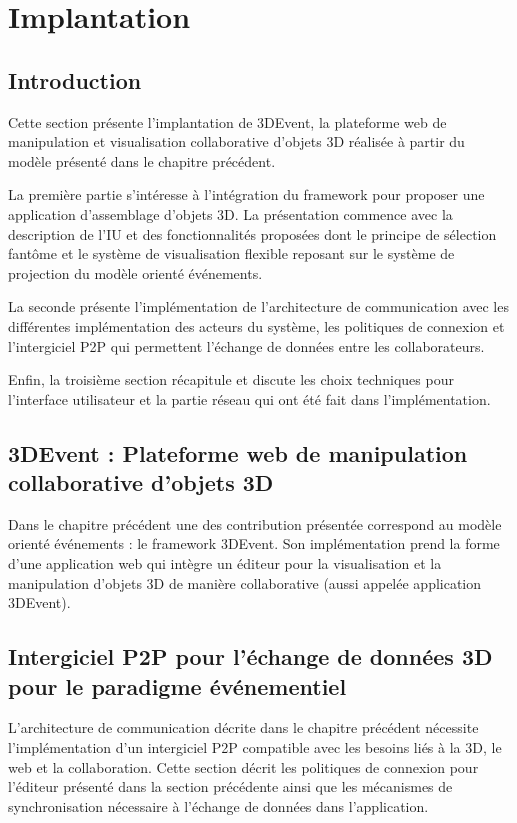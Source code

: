 
\chapter{Implantation}
\chaptertable

\section{Introduction} 
Cette section présente l'implantation de 3DEvent, la plateforme web de 
manipulation et visualisation collaborative d'objets 3D réalisée à partir du modèle 
présenté dans le chapitre précédent.

La première partie s'intéresse à l'intégration 
du framework pour proposer une application d'assemblage d'objets 3D. La 
présentation commence avec la description de l'\gls{IU} et des fonctionnalités 
proposées dont le principe de sélection fantôme et le système de visualisation 
flexible reposant sur le système de projection du modèle orienté événements. 

La seconde présente l'implémentation de l'architecture de communication avec les 
différentes implémentation des acteurs du système, les politiques de connexion et 
l'intergiciel \gls{P2P} qui permettent l'échange de données entre les collaborateurs.

Enfin, la troisième section récapitule et discute les choix techniques pour 
l'interface utilisateur et la partie réseau qui ont été fait dans l'implémentation.


\section{3DEvent : Plateforme web de manipulation collaborative d'objets 3D}
Dans le chapitre précédent une des contribution présentée correspond au 
modèle orienté événements : le \gls{framework} 3DEvent. 
Son implémentation prend la forme d'une application web qui intègre un éditeur 
pour la visualisation et la manipulation d'objets 3D de manière collaborative (aussi 
appelée \og application 3DEvent\fg{}).



\section{Intergiciel P2P pour l'échange de données 3D pour le paradigme 
événementiel}

L'architecture de communication décrite dans le chapitre précédent nécessite 
l'implémentation d'un intergiciel P2P compatible avec les besoins liés à la 3D, le 
web et la collaboration. Cette section décrit les politiques de connexion pour 
l'éditeur présenté dans la section précédente ainsi que les mécanismes de 
synchronisation nécessaire à l'échange de données dans l'application. 


